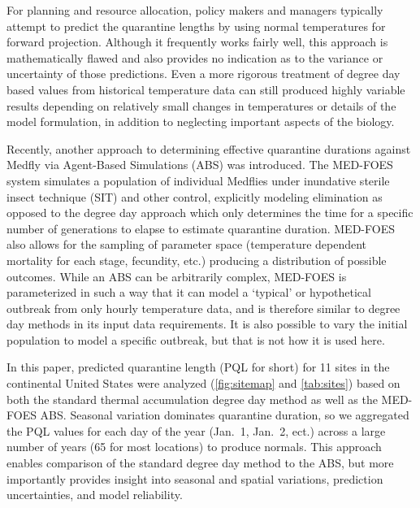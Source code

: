 \documentclass[10pt,a4paper,twocolumn]{article}
\begin{document}
For planning and resource allocation, policy makers and managers 
typically attempt to predict the quarantine lengths by using
normal temperatures for forward projection.%
Although it frequently works fairly well,
this approach is mathematically flawed 
and also provides no indication as to the variance or uncertainty
of those predictions.
Even a more rigorous treatment of degree day based values from
historical temperature data can still produced highly variable results
depending on relatively small changes in temperatures or details of
the model formulation\cite{Roltsch1999}, in addition to neglecting
important aspects of the biology.

Recently, another approach to determining effective quarantine 
durations against Medfly via Agent-Based Simulations (ABS)\cite{manoukis_agent-based_2014}
was introduced. 
The MED-FOES system simulates a population of individual Medflies 
under inundative sterile insect technique (SIT) and other control, 
explicitly modeling elimination as opposed to the degree day 
approach which only determines the time for a specific
number of generations to elapse to estimate quarantine duration.
MED-FOES also allows for the sampling of parameter space
(temperature dependent mortality for each stage, fecundity, etc.)
producing a distribution of possible outcomes.
While an ABS can be arbitrarily complex, MED-FOES is parameterized
in such a way that it can model a `typical' or hypothetical outbreak from only hourly temperature data,
and is therefore similar to degree day methods in its input data requirements.
It is also possible to vary the initial population to model a specific outbreak, but
that is not how it is used here.

In this paper, predicted quarantine length (PQL for short) 
for 11 sites in the continental United States were analyzed
(\autoref{fig:sitemap} and \autoref{tab:sites})
based on both the standard thermal accumulation degree day method\cite{ECY:ECY1969503514} 
as well as the MED-FOES ABS\cite{manoukis_computer_2014}. 
Seasonal variation dominates quarantine duration, 
so we aggregated the PQL values for each day of the year 
(Jan.\ 1, Jan.\ 2, ect.) 
across a large number of years (65 for most locations) to produce normals.
This approach enables comparison of the standard degree day 
method to the ABS, but more importantly provides insight 
into seasonal and spatial variations, prediction uncertainties, 
and model reliability.
\end{document}

